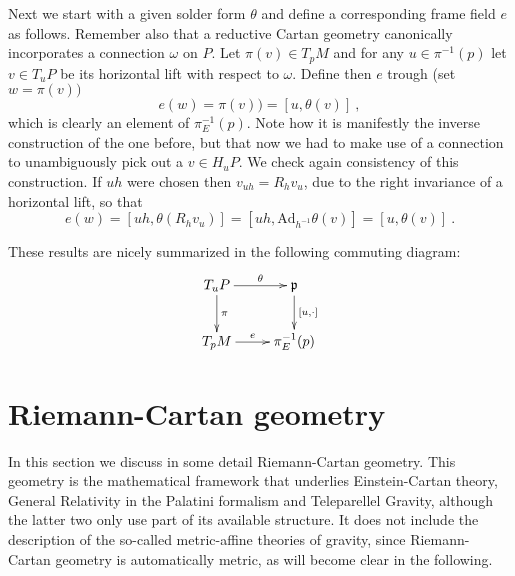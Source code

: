 \documentclass[11pt]{article}
\begin{document}
Next we start with a given solder form $\theta$ and define a 
corresponding frame field $e$ as follows. Remember also that a 
reductive Cartan geometry canonically incorporates a connection 
$\omega$ on $P$. Let $\pi(v) \in T_pM$ and for any $u \in 
\pi^{-1}(p)$ let $v \in T_uP$ be its horizontal lift with respect 
to $\omega$. Define then $e$ trough (set $w = \pi(v))$
%
\begin{displaymath}
	e(w) = \pi(v)) = [u,\theta(v)]~,
\end{displaymath}
which is clearly an element of $\pi^{-1}_E(p)$. Note how it is 
manifestly the inverse construction of the one before, but that 
now we had to make use of a connection to unambiguously pick out 
a $v \in H_uP$. We check again consistency of this construction.  
If $uh$ were chosen then $v_{uh} = R_h v_u$, due to the right 
invariance of a horizontal lift, so that
%
\begin{displaymath}
	e(w) = [uh,\theta(R_h v_u)] = [uh,\mathrm{Ad}_{h^{-1}} 
	\theta(v)] = [u,\theta(v)]~.
\end{displaymath}

These results are nicely summarized in the following commuting 
diagram:
\begin{displaymath}
	\xymatrix{
		T_uP
			\ar[r]^-{\theta}
			\ar[d]^-{\pi}
		& \mathfrak{p}
			\ar[d]^-{[u,\cdot]}
		\\
		T_pM
			\ar[r]^-{e}
		& \pi^{-1}_E(p)
	}
\end{displaymath}


\section{Riemann-Cartan geometry}
\label{sec:RC_geometry}

In this section we discuss in some detail Riemann-Cartan 
geometry. This geometry is the mathematical framework that 
underlies Einstein-Cartan theory, General Relativity in the 
Palatini formalism and Teleparellel Gravity, although the latter 
two only use part of its available structure. It does not include 
the description of the so-called metric-affine theories of 
gravity, since Riemann-Cartan geometry is automatically metric, 
as will become clear in the following.
\end{document}
